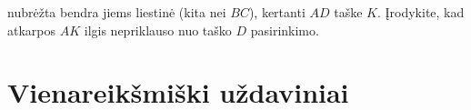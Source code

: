 \begin{enumerate}
    nubrėžta bendra jiems liestinė (kita nei $BC$), kertanti
    $AD$ taške $K$. Įrodykite, kad atkarpos $AK$ ilgis
    nepriklauso nuo taško $D$ pasirinkimo.
\end{enumerate}

\newpage
\section{Vienareikšmiški uždaviniai}


